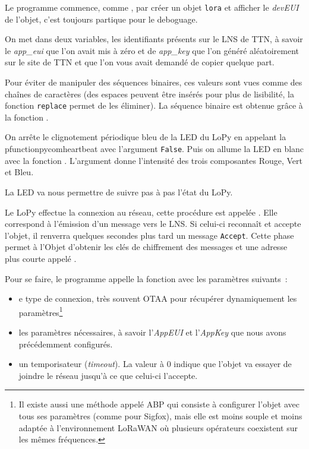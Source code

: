 
Le programme  commence, comme , par créer un objet \texttt{lora} et afficher le \textit{devEUI} de l'objet, c'est toujours partique pour le deboguage.



On met dans deux variables, les identifiants présents sur le LNS de TTN, à savoir le \textit{app\_eui} que l'on avait mis à zéro et de \textit{app\_key} que l'on généré aléatoirement sur le site de TTN et que l'on vous avait demandé de copier quelque part.

Pour éviter de manipuler des séquences binaires, ces valeurs sont vues comme des chaînes de caractères (des espaces peuvent être insérés pour plus de lisibilité, la fonction \texttt{replace} permet de les éliminer). La séquence binaire est obtenue grâce à la fonction .



On arrête le clignotement périodique bleu de la LED du LoPy en appelant la pfunction{pycom}{heartbeat} avec l'argument \texttt{False}. Puis on allume la LED en blanc avec la fonction . L'argument donne l'intensité des trois composantes Rouge, Vert et Bleu. 

La LED va nous permettre de suivre pas à pas l'état du LoPy.


Le LoPy effectue la connexion au réseau, cette procédure est appelée \textit{}. Elle correspond à l'émission d'un message vers le LNS. Si celui-ci reconnaît et accepte l'objet, il renverra quelques secondes plus tard un message \texttt{Accept}. Cette phase permet à l'Objet d'obtenir les clés de chiffrement des messages et une adresse plus courte appelé \textit{}.

Pour se faire, le programme appelle la fonction  avec les paramètres suivants~: 
\begin{itemize}
    \item e type de connexion, très souvent \ac{OTAA} pour récupérer dynamiquement les paramètres\footnote{Il existe aussi une méthode appelé \ac{ABP} qui consiste à configurer l'objet avec tous ses paramètres (comme pour Sigfox), mais elle est moins souple et moins adaptée à l'environnement LoRaWAN où plusieurs opérateurs coexistent sur les mêmes fréquences.}  
    \item les paramètres nécessaires, à savoir l'\textit{AppEUI} et l'\textit{AppKey} que nous avons précédemment configurés.
    \item un temporisateur (\textit{timeout}). La valeur à 0 indique que l'objet va essayer de joindre le réseau jusqu'à ce que celui-ci l'accepte.
\end{itemize}
         \vspace{1em}

